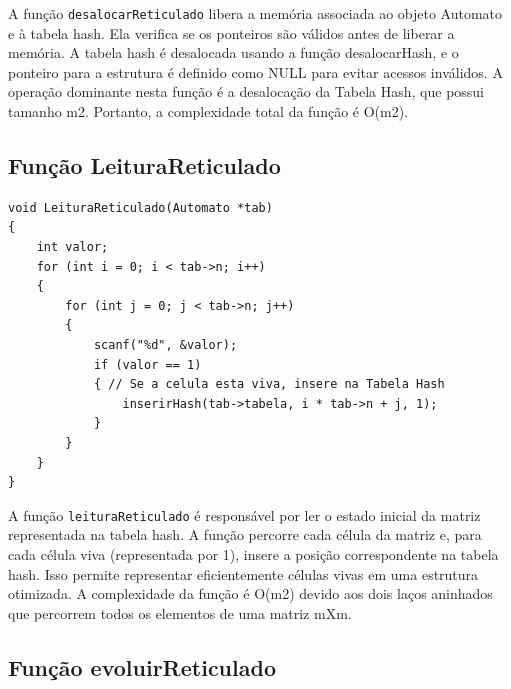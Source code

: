\documentclass{article}
\begin{document}
 \par A função \verb|desalocarReticulado| libera a memória associada ao objeto Automato e à tabela hash. Ela verifica se os ponteiros são válidos antes de liberar a memória. A tabela hash é desalocada usando a função desalocarHash, e o ponteiro para a estrutura é definido como NULL para evitar acessos inválidos. A operação dominante nesta função é a desalocação da Tabela Hash, que possui tamanho m2. Portanto, a complexidade total da função é O(m2).

 
 
\subsection{Função LeituraReticulado  }

\begin{lstlisting}[caption={},label={lst:cod1},language={[x86masm]Assembler}]
void LeituraReticulado(Automato *tab)
{
    int valor;
    for (int i = 0; i < tab->n; i++)
    {
        for (int j = 0; j < tab->n; j++)
        {
            scanf("%d", &valor);
            if (valor == 1)
            { // Se a celula esta viva, insere na Tabela Hash
                inserirHash(tab->tabela, i * tab->n + j, 1);
            }
        }
    }
}

 \end{lstlisting}

 \par A função  \verb|leituraReticulado| é responsável por ler o estado inicial da matriz representada na tabela hash. A função percorre cada célula da matriz e, para cada célula viva (representada por 1), insere a posição correspondente na tabela hash. Isso permite representar eficientemente células vivas em uma estrutura otimizada. A complexidade da função é O(m2) devido aos dois laços aninhados que percorrem todos os elementos de uma matriz mXm.


\subsection{Função evoluirReticulado  }
\end{document}
